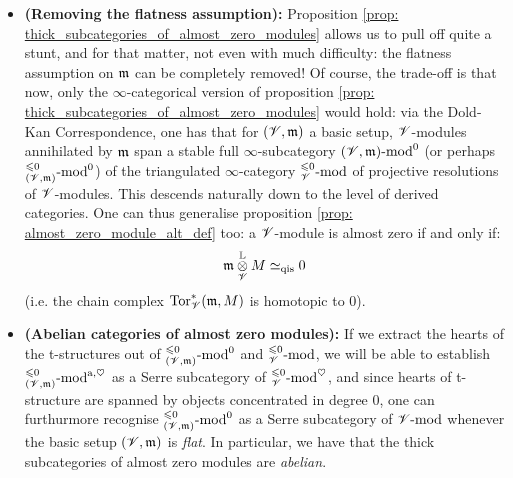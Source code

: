             \begin{remark} \label{remark: almost_zero_modules_over_non_flat_basic_setups}
                \noindent
                \begin{itemize}
                    \item \textbf{(Removing the flatness assumption):} Proposition \ref{prop: thick_subcategories_of_almost_zero_modules} allows us to pull off quite a stunt, and for that matter, not even with much difficulty: the flatness assumption on $\mathfrak{m}$ can be completely removed! Of course, the trade-off is that now, only the $\infty$-categorical version of proposition \ref{prop: thick_subcategories_of_almost_zero_modules} would hold: via the Dold-Kan Correspondence, one has that for $(\mathscr{V}, \mathfrak{m})$ a basic setup, $\mathscr{V}$-modules annihilated by $\mathfrak{m}$ span a stable full $\infty$-subcategory $(\mathscr{V}, \mathfrak{m})\text{-}\mathrm{mod}^0$ (or perhaps ${}^{\leqslant 0}_{(\mathscr{V}, \mathfrak{m})}\text{-}\mathrm{mod}^0$) of the triangulated $\infty$-category ${}^{\leqslant 0}_{\mathscr{V}}\text{-}\mathrm{mod}$ of projective resolutions of $\mathscr{V}$-modules. This descends naturally down to the level of derived categories. One can thus generalise proposition \ref{prop: almost_zero_module_alt_def} too: a $\mathscr{V}$-module is almost zero if and only if:
                        $$\m \tensor_{\scrV}^{\L} M \cong_{\qis} 0$$
                    (i.e. the chain complex $\mathrm{Tor}_{\mathscr{V}}^*(\mathfrak{m}, M)$ is homotopic to $0$).
                    \item \textbf{(Abelian categories of almost zero modules):} If we extract the hearts of the t-structures out of ${}^{\leqslant 0}_{(\mathscr{V}, \mathfrak{m})}\text{-}\mathrm{mod}^0$ and ${}^{\leqslant 0}_{\mathscr{V}}\text{-}\mathrm{mod}$, we will be able to establish ${}^{\leqslant 0}_{(\mathscr{V}, \mathfrak{m})}\text{-}\mathrm{mod}^{\mathrm{a}, \heartsuit}$ as a Serre subcategory of ${}^{\leqslant 0}_{\mathscr{V}}\text{-}\mathrm{mod}^{\heartsuit}$, and since hearts of t-structure are spanned by objects concentrated in degree $0$, one can furthurmore recognise ${}^{\leqslant 0}_{(\mathscr{V}, \mathfrak{m})}\text{-}\mathrm{mod}^0$ as a Serre subcategory of $\mathscr{V}\text{-}\mathrm{mod}$ whenever the basic setup $(\mathscr{V}, \mathfrak{m})$ is \textit{flat}. In particular, we have that the thick subcategories of almost zero modules are \textit{abelian}.
                \end{itemize}
            \end{remark}
            
